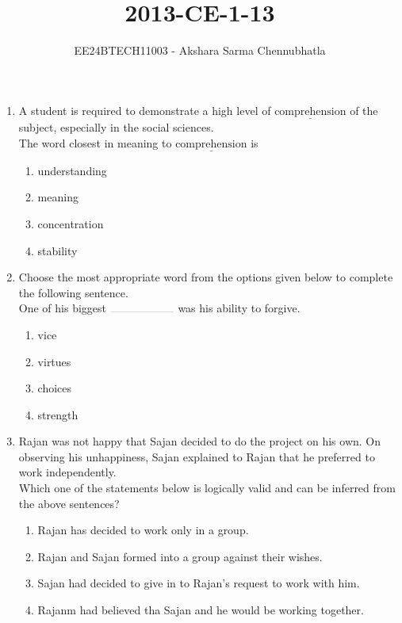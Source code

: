 \documentclass[journal,12pt,onecolumn]{IEEEtran}
\theoremstyle{remark}
\begin{document}

\title{2013-CE-1-13}
\author{EE24BTECH11003 - Akshara Sarma Chennubhatla}
\maketitle
\begin{enumerate}
\item A student is required to demonstrate a high level of $\underline{\text{comprehension}}$ of the subject, especially in the social sciences.\\
The word closest in meaning to $\underline{\text{comprehension}}$ is
\hfill{}
\begin{enumerate}
\item understanding
\item meaning
\item concentration
\item stability
\end{enumerate}

\item Choose the most appropriate word from the options given below to complete the following sentence.\\
One of his biggest $\rule{2cm}{0.1pt}$ was his ability to forgive.
\hfill{}
\begin{enumerate}
\item vice
\item virtues
\item choices
\item strength
\end{enumerate}

\item Rajan was not happy that Sajan decided to do the project on his own. On observing his unhappiness, Sajan explained to Rajan that he preferred to work independently.\\
Which one of the statements below is logically valid and can be inferred from the above sentences?
\hfill{}
\begin{enumerate}
\item Rajan has decided to work only in a group.
\item Rajan and Sajan formed into a group against their wishes.
\item Sajan had decided to give in to Rajan's request to work with him.
\item Rajanm had believed tha Sajan and he would be working together.
\end{enumerate}


\end{enumerate}
\end{document}
